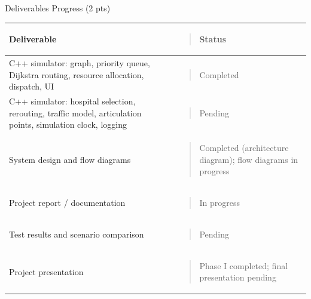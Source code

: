 \documentclass[
]{article}
\newcounter{none} %
\begin{document}
Deliverables Progress (2 pts)

{\def\LTcaptype{none} %
\begin{longtable}[]{@{}
  >{\raggedright\arraybackslash}p{}
  >{\raggedright\arraybackslash}p{}@{}}
\toprule\noalign{}
\begin{minipage}[b]{\linewidth}\raggedright
\textbf{Deliverable}
\end{minipage} & \begin{minipage}[b]{\linewidth}\raggedright
\begin{quote}
\textbf{Status}
\end{quote}
\end{minipage} \\
\midrule\noalign{}
\endhead
\bottomrule\noalign{}
\endlastfoot
C++ simulator: graph, priority queue, Dijkstra routing, resource
allocation, dispatch, UI & \begin{minipage}[t]{\linewidth}\raggedright
\begin{quote}
Completed
\end{quote}
\end{minipage} \\
C++ simulator: hospital selection, rerouting, traffic model,
articulation points, simulation clock, logging &
\begin{minipage}[t]{\linewidth}\raggedright
\begin{quote}
Pending
\end{quote}
\end{minipage} \\
System design and flow diagrams &
\begin{minipage}[t]{\linewidth}\raggedright
\begin{quote}
Completed (architecture diagram); flow diagrams in progress
\end{quote}
\end{minipage} \\
Project report / documentation &
\begin{minipage}[t]{\linewidth}\raggedright
\begin{quote}
In progress
\end{quote}
\end{minipage} \\
Test results and scenario comparison &
\begin{minipage}[t]{\linewidth}\raggedright
\begin{quote}
Pending
\end{quote}
\end{minipage} \\
Project presentation & \begin{minipage}[t]{\linewidth}\raggedright
\begin{quote}
Phase I completed; final presentation pending
\end{quote}
\end{minipage} \\
\end{longtable}
}
\end{document}
